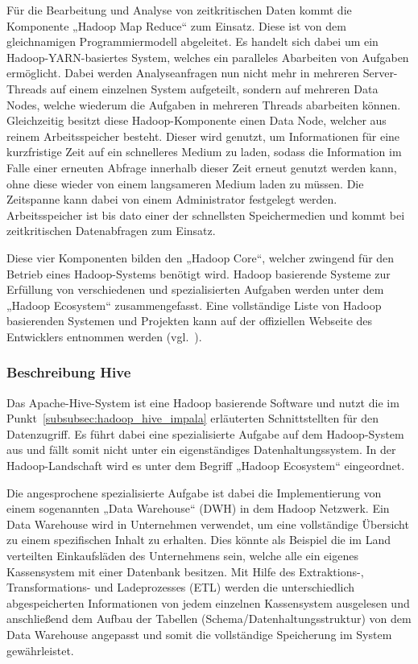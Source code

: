 Für die Bearbeitung und Analyse von zeitkritischen Daten kommt die Komponente
„Hadoop Map Reduce“ zum Einsatz. Diese ist von dem gleichnamigen
Programmiermodell abgeleitet. Es handelt sich dabei um ein
Hadoop-YARN-basiertes System, welches ein paralleles Abarbeiten von Aufgaben
ermöglicht.  Dabei werden Analyseanfragen nun nicht mehr in mehreren
Server-Threads auf einem einzelnen System aufgeteilt, sondern auf mehreren Data
Nodes, welche wiederum die Aufgaben in mehreren Threads abarbeiten können.
Gleichzeitig besitzt diese Hadoop-Komponente einen Data Node, welcher aus
reinem Arbeitsspeicher besteht. Dieser wird genutzt, um Informationen für eine
kurzfristige Zeit auf ein schnelleres Medium zu laden, sodass die Information
im Falle einer erneuten Abfrage innerhalb dieser Zeit erneut genutzt werden
kann, ohne diese wieder von einem langsameren Medium laden zu müssen. Die
Zeitspanne kann dabei von einem Administrator festgelegt werden.
Arbeitsspeicher ist bis dato einer der schnellsten Speichermedien und kommt bei
zeitkritischen Datenabfragen zum Einsatz.

Diese vier Komponenten bilden den „Hadoop Core“, welcher zwingend für den
Betrieb eines Hadoop-Systems benötigt wird. Hadoop basierende Systeme zur
Erfüllung von verschiedenen und spezialisierten Aufgaben werden unter dem
„Hadoop Ecosystem“ zusammengefasst. Eine vollständige Liste von
Hadoop basierenden Systemen und Projekten kann auf der offiziellen Webseite des
Entwicklers entnommen werden (vgl.~\cite{Hadoop_related_projects}).
\nl%

\subsubsection{Beschreibung Hive}
\label{subsubsec:hadoop_beschreibung}
Das Apache-Hive-System ist eine Hadoop basierende Software und nutzt die im
Punkt~\ref{subsubsec:hadoop_hive_impala} erläuterten Schnittstellten für den
Datenzugriff. Es führt dabei eine spezialisierte Aufgabe auf dem Hadoop-System
aus und fällt somit nicht unter ein eigenständiges Datenhaltungssystem. In der
Hadoop-Landschaft wird es unter dem Begriff „Hadoop Ecosystem“ eingeordnet.

Die angesprochene spezialisierte Aufgabe ist dabei die Implementierung von
einem sogenannten „Data Warehouse“ (DWH) in dem Hadoop Netzwerk. Ein Data
Warehouse wird in Unternehmen verwendet, um eine vollständige Übersicht zu
einem spezifischen Inhalt zu erhalten. Dies könnte als Beispiel die im Land
verteilten Einkaufsläden des Unternehmens sein, welche alle ein eigenes
Kassensystem mit einer Datenbank besitzen. Mit Hilfe des Extraktions-,
Transformations- und Ladeprozesses (ETL) werden die unterschiedlich
abgespeicherten Informationen von jedem einzelnen Kassensystem ausgelesen und
anschließend dem Aufbau der Tabellen (Schema/Datenhaltungsstruktur) von dem
Data Warehouse angepasst und somit die vollständige Speicherung im System
gewährleistet.

